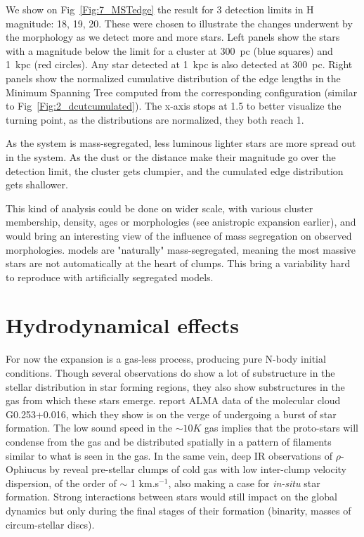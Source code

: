 We show on Fig~\ref{Fig:7_MSTedge} the result for 3 detection limits in H magnitude: 18, 19, 20. These were chosen to illustrate the changes underwent by the morphology as we detect more and more stars. Left panels show the stars with a magnitude below the limit for a cluster at 300~pc (blue squares) and 1~kpc (red circles). Any star detected at 1~kpc is also detected at 300~pc. Right panels show the normalized cumulative distribution of the edge lengths in the Minimum Spanning Tree computed from the corresponding configuration (similar to Fig~\ref{Fig:2_dcutcumulated}). The x-axis stops at 1.5 to better visualize the turning point, as the distributions are normalized, they both reach 1.



As the system is mass-segregated, less luminous lighter stars are more spread out in the system. As the dust or the distance make their magnitude go over the detection limit, the cluster gets clumpier, and the cumulated edge distribution gets shallower. 

This kind of analysis could be done on wider scale, with various cluster membership, density, ages or morphologies (see anistropic expansion earlier), and would bring an interesting view of the influence of mass segregation on observed morphologies. \HubLem models are "naturally" mass-segregated, meaning the most massive stars are not automatically at the heart of clumps. This bring a variability hard to reproduce with artificially segregated models. 



\section{Hydrodynamical effects}

For now the \HubLem expansion is a gas-less process, producing pure N-body initial conditions. Though several observations do show a lot of substructure in the stellar distribution in star forming regions, they also show  substructures in the gas from which these stars emerge. \cite{Rathborne2015} report ALMA data of the molecular cloud G0.253+0.016, which they show is on the verge of undergoing a burst of star formation. The low sound speed in the $\sim 10K$ gas implies that the proto-stars will condense from the gas and be distributed spatially in a pattern of filaments similar to what is seen in the gas. In the same vein, deep IR observations of $\rho$-Ophiucus by \cite{Andre2007} reveal pre-stellar clumps of cold gas with low inter-clump velocity dispersion, of the order of $\sim$ 1 km.s$^{-1}$, also making a case  for {\it in-situ} star formation. Strong interactions between stars would still impact on the global dynamics but only during the final stages of their formation (binarity, masses of circum-stellar discs).

